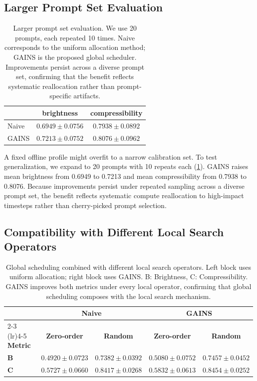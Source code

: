 \subsection{Larger Prompt Set Evaluation}
\label{sec:exp-larger-prompts}
\begin{table}[t]
\centering
\caption{Larger prompt set evaluation.
We use 20 prompts, each repeated 10 times.
Naive corresponds to the uniform allocation method; GAINS is the proposed global scheduler.
Improvements persist across a diverse prompt set, confirming that the benefit reflects systematic reallocation rather than prompt-specific artifacts.}
\label{tab:larger_prompt_exp}
\begin{tabular}{lcc}
\toprule
 & \textbf{brightness} & \textbf{compressibility} \\
\midrule
Naive             & $0.6949 \pm 0.0756$ & $0.7938 \pm 0.0892$ \\
GAINS             & $\mathbf{0.7213 \pm 0.0752}$ & $\mathbf{0.8076 \pm 0.0962}$ \\
\bottomrule
\end{tabular}
\end{table}

A fixed offline profile might overfit to a narrow calibration set. To test generalization, we expand to 20 prompts with 10 repeats each (\cref{tab:larger_prompt_exp}).
GAINS raises mean brightness from 0.6949 to 0.7213 and mean compressibility from 0.7938 to 0.8076.
Because improvements persist under repeated sampling across a diverse prompt set, the benefit reflects systematic compute reallocation to high-impact timesteps rather than cherry-picked prompt selection.

\subsection{Compatibility with Different Local Search Operators}
\label{sec:exp-local-operator}
\begin{table}[t]
\centering
\caption{Global scheduling combined with different local search operators.
Left block uses uniform allocation; right block uses GAINS.
B: Brightness, C: Compressibility.
GAINS improves both metrics under every local operator, confirming that global scheduling composes with the local search mechanism.}
\label{tab:local_search_combo}
\begin{tabular}{lcccc}
\toprule
& \multicolumn{2}{c}{\textbf{Naive}} & \multicolumn{2}{c}{\textbf{GAINS}} \\
\cmidrule(lr){2-3} \cmidrule(lr){4-5}
\textbf{Metric} & \textbf{Zero-order} & \textbf{Random} & \textbf{Zero-order} & \textbf{Random} \\
\midrule
\textbf{B} & $0.4920 \pm 0.0723$ & $0.7382 \pm 0.0392$ & $\mathbf{0.5080 \pm 0.0752}$ & $\mathbf{0.7457 \pm 0.0452}$ \\
\textbf{C} & $0.5727 \pm 0.0660$ & $0.8417 \pm 0.0268$ & $\mathbf{0.5832 \pm 0.0613}$ & $\mathbf{0.8454 \pm 0.0252}$ \\
\bottomrule
\end{tabular}
\end{table}

